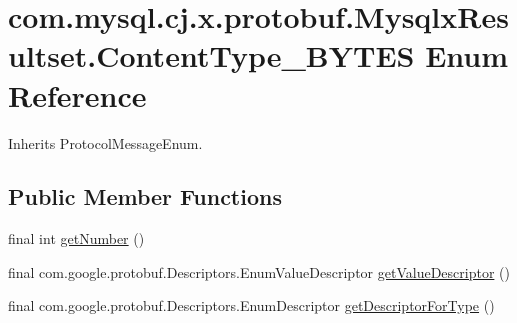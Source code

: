 \hypertarget{enumcom_1_1mysql_1_1cj_1_1x_1_1protobuf_1_1_mysqlx_resultset_1_1_content_type___b_y_t_e_s}{}\section{com.\+mysql.\+cj.\+x.\+protobuf.\+Mysqlx\+Resultset.\+Content\+Type\+\_\+\+B\+Y\+T\+ES Enum Reference}
\label{enumcom_1_1mysql_1_1cj_1_1x_1_1protobuf_1_1_mysqlx_resultset_1_1_content_type___b_y_t_e_s}


Inherits Protocol\+Message\+Enum.

\subsection*{Public Member Functions}
\begin{DoxyCompactItemize}
\item 
final int \mbox{\hyperlink{enumcom_1_1mysql_1_1cj_1_1x_1_1protobuf_1_1_mysqlx_resultset_1_1_content_type___b_y_t_e_s_a29b28a68964405f86d49e810e595f98d}{get\+Number}} ()
\item 
final com.\+google.\+protobuf.\+Descriptors.\+Enum\+Value\+Descriptor \mbox{\hyperlink{enumcom_1_1mysql_1_1cj_1_1x_1_1protobuf_1_1_mysqlx_resultset_1_1_content_type___b_y_t_e_s_ade1ad581ba0cf23545afe1acde306394}{get\+Value\+Descriptor}} ()
\item 
final com.\+google.\+protobuf.\+Descriptors.\+Enum\+Descriptor \mbox{\hyperlink{enumcom_1_1mysql_1_1cj_1_1x_1_1protobuf_1_1_mysqlx_resultset_1_1_content_type___b_y_t_e_s_a1b4bb6cd013a284d02805ee92772d8ef}{get\+Descriptor\+For\+Type}} ()
\end{DoxyCompactItemize}
